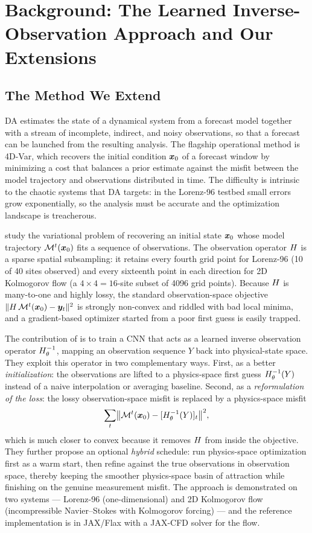 \section{Background: The Learned Inverse-Observation Approach and Our Extensions}
\label{sec:background}

\subsection{The Method We Extend}

DA estimates the state of a dynamical system from a forecast model together with a stream of incomplete, indirect, and noisy observations, so that a forecast can be launched from the resulting analysis. The flagship operational method is 4D-Var, which recovers the initial condition $\bm{x}_0$ of a forecast window by minimizing a cost that balances a prior estimate against the misfit between the model trajectory and observations distributed in time. The difficulty is intrinsic to the chaotic systems that DA targets: in the Lorenz-96 testbed small errors grow exponentially, so the analysis must be accurate and the optimization landscape is treacherous.

\citet{frerix2021invobs} study the variational problem of recovering an initial state $\bm{x}_0$ whose model trajectory $\mathcal{M}^t(\bm{x}_0)$ fits a sequence of observations. The observation operator $H$ is a sparse spatial subsampling: it retains every fourth grid point for Lorenz-96 (10 of 40 sites observed) and every sixteenth point in each direction for 2D Kolmogorov flow (a $4\times 4 = 16$-site subset of 4096 grid points). Because $H$ is many-to-one and highly lossy, the standard observation-space objective $\lVert H\,\mathcal{M}^t(\bm{x}_0) - \bm{y}_t\rVert^2$ is strongly non-convex and riddled with bad local minima, and a gradient-based optimizer started from a poor first guess is easily trapped.

The contribution of \citet{frerix2021invobs} is to train a CNN that acts as a learned inverse observation operator $H^{-1}_{\theta}$, mapping an observation sequence $Y$ back into physical-state space. They exploit this operator in two complementary ways. First, as a better \emph{initialization}: the observations are lifted to a physics-space first guess $H^{-1}_{\theta}(Y)$ instead of a naive interpolation or averaging baseline. Second, as a \emph{reformulation of the loss}: the lossy observation-space misfit is replaced by a physics-space misfit
\[
\sum_t \bigl\lVert \mathcal{M}^t(\bm{x}_0) - [H^{-1}_{\theta}(Y)]_t \bigr\rVert^2,
\]
which is much closer to convex because it removes $H$ from inside the objective. They further propose an optional \emph{hybrid} schedule: run physics-space optimization first as a warm start, then refine against the true observations in observation space, thereby keeping the smoother physics-space basin of attraction while finishing on the genuine measurement misfit. The approach is demonstrated on two systems --- Lorenz-96 (one-dimensional) and 2D Kolmogorov flow (incompressible Navier--Stokes with Kolmogorov forcing) --- and the reference implementation is in JAX/Flax with a JAX-CFD solver for the flow.

